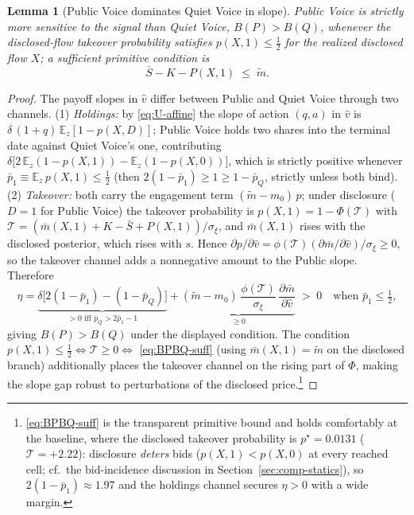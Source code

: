 \documentclass[11pt]{article}
\newtheorem{lemma}{Lemma}
\newcommand{\E}{\mathbb{E}}
\newcommand{\1}{\mathbf{1}}
\providecommand{\mt}{\tilde{m}}
\providecommand{\vhat}{\hat{v}}
\providecommand{\Sbar}{\bar{S}}
\providecommand{\Kcost}{K}
\providecommand{\sigxi}{\sigma_\xi}
\providecommand{\deltaliq}{\delta}
\begin{document}
\begin{lemma}[Public Voice dominates Quiet Voice in slope]
\label{lem:BP-BQ}
Public Voice is strictly more sensitive to the signal than Quiet Voice, $B(P)>B(Q)$, whenever the disclosed-flow takeover probability satisfies $p(X,1)\le\tfrac12$ for the realized disclosed flow $X$; a sufficient primitive condition is
\begin{equation}
\label{eq:BPBQ-suff}
\Sbar-\Kcost-P(X,1)\;\le\;\mt .
\end{equation}
\end{lemma}

\begin{proof}
The payoff slopes in $\vhat$ differ between Public and Quiet Voice through two channels. (1) \emph{Holdings:} by \eqref{eq:U-affine} the slope of action $(q,a)$ in $\vhat$ is $\deltaliq\,(1+q)\,\E_z[1-p(X,D)]$; Public Voice holds two shares into the terminal date against Quiet Voice's one, contributing $\deltaliq\bigl[2\,\E_z(1-p(X,1))-\E_z(1-p(X,0))\bigr]$, which is strictly positive whenever $\bar p_1\equiv\E_z\,p(X,1)\le\tfrac12$ (then $2(1-\bar p_1)\ge1\ge1-\bar p_Q$, strictly unless both bind). (2) \emph{Takeover:} both carry the engagement term $(\mt-m_0)\,p$; under disclosure ($D=1$ for Public Voice) the takeover probability is $p(X,1)=1-\Phi(\mathcal{T})$ with $\mathcal{T}=(\bar{m}(X,1)+\Kcost-\Sbar+P(X,1))/\sigxi$, and $\bar{m}(X,1)$ rises with the disclosed posterior, which rises with $s$. Hence $\partial p/\partial\vhat=\phi(\mathcal{T})(\partial\bar{m}/\partial\vhat)/\sigxi\ge0$, so the takeover channel adds a nonnegative amount to the Public slope. Therefore
\[
\eta=\underbrace{\deltaliq\bigl[2(1-\bar p_1)-(1-\bar p_Q)\bigr]}_{>0\text{ iff }\bar p_Q>2\bar p_1-1}
+\underbrace{(\mt-m_0)\,\frac{\phi(\mathcal{T})}{\sigxi}\,
\frac{\partial\bar{m}}{\partial\vhat}}_{\ge0}\;>\;0
\quad\text{when }\bar p_1\le\tfrac12,
\]
giving $B(P)>B(Q)$ under the displayed condition. The condition $p(X,1)\le\tfrac12\iff \mathcal{T}\ge0\iff$ \eqref{eq:BPBQ-suff} (using $\bar{m}(X,1)=\mt$ on the disclosed branch) additionally places the takeover channel on the rising part of $\Phi$, making the slope gap robust to perturbations of the disclosed price.\footnote{\eqref{eq:BPBQ-suff} is the transparent primitive bound and holds comfortably at the baseline, where the disclosed takeover probability is $p^\star=0.0131$ ($\mathcal{T}=+2.22$): disclosure \emph{deters} bids ($p(X,1)<p(X,0)$ at every reached cell; cf.\ the bid-incidence discussion in Section~\ref{sec:comp-statics}), so $2(1-\bar p_1)\approx1.97$ and the holdings channel secures $\eta>0$ with a wide margin.}
\end{proof}
\end{document}
